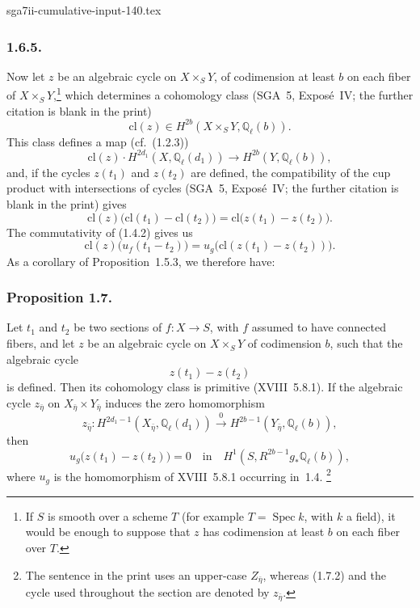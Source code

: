 \begin{filecontents*}{sga7ii-cumulative-input-140.tex}
\subsubsection*{1.6.5.}
Now let $z$ be an algebraic cycle on $X\times_S Y$, of codimension at least
$b$ on each fiber of $X\times_S Y$,\footnote{If $S$ is smooth over a scheme
$T$ (for example $T=\operatorname{Spec}k$, with $k$ a field), it would be
enough to suppose that $z$ has codimension at least $b$ on each fiber over
$T$.} which determines a cohomology class (SGA~5, Expos\'e~IV; the further
citation is blank in the print)
\begin{equation}\tag{1.6.6}
\mathrm{cl}(z)\in H^{2b}(X\times_S Y,\mathbb Q_\ell(b)).
\end{equation}
This class defines a map (cf.~(1.2.3))
\begin{equation}\tag{1.6.7}
\mathrm{cl}(z)\mathbin{\cdot}H^{2d_1}(X,\mathbb Q_\ell(d_1))
\longrightarrow H^{2b}(Y,\mathbb Q_\ell(b)),
\end{equation}
and, if the cycles $z(t_1)$ and $z(t_2)$ are defined, the compatibility of
the cup product with intersections of cycles (SGA~5, Expos\'e~IV; the
further citation is blank in the print) gives
\begin{equation}\tag{1.6.8}
\mathrm{cl}(z)\bigl(\mathrm{cl}(t_1)-\mathrm{cl}(t_2)\bigr)
=\mathrm{cl}\bigl(z(t_1)-z(t_2)\bigr).
\end{equation}
The commutativity of (1.4.2) gives us
\begin{equation}\tag{1.6.9}
\mathrm{cl}(z)\bigl(u_f(t_1-t_2)\bigr)
=u_g\bigl(\mathrm{cl}(z(t_1)-z(t_2))\bigr).
\end{equation}
As a corollary of Proposition~1.5.3, we therefore have:

\subsubsection*{Proposition 1.7.}
Let $t_1$ and $t_2$ be two sections of $f:X\longrightarrow S$, with $f$
assumed to have connected fibers, and let $z$ be an algebraic cycle on
$X\times_S Y$ of codimension $b$, such that the algebraic cycle
\begin{equation}\tag{1.7.1}
z(t_1)-z(t_2)
\end{equation}
is defined.  Then its cohomology class is primitive (XVIII~5.8.1).  If the
algebraic cycle $z_{\bar\eta}$ on
$X_{\bar\eta}\times Y_{\bar\eta}$ induces the zero homomorphism
\begin{equation}\tag{1.7.2}
z_{\bar\eta}:H^{2d_1-1}(X_{\bar\eta},\mathbb Q_\ell(d_1))
\stackrel{0}{\longrightarrow}
H^{2b-1}(Y_{\bar\eta},\mathbb Q_\ell(b)),
\end{equation}
then
\begin{equation}\tag{1.7.3}
u_g\bigl(z(t_1)-z(t_2)\bigr)=0\quad\text{in}\quad
H^1(S,R^{2b-1}g_*\mathbb Q_\ell(b)),
\end{equation}
where $u_g$ is the homomorphism of XVIII~5.8.1 occurring in~1.4.
\footnote{The sentence in the print uses an upper-case $Z_{\bar\eta}$,
whereas (1.7.2) and the cycle used throughout the section are denoted by
$z_{\bar\eta}$.}
\end{filecontents*}
